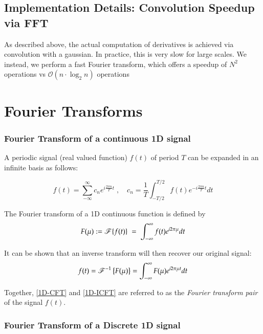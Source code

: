    
\subsection{Implementation Details: Convolution Speedup via FFT}

As described above, the actual computation of derivatives is achieved via convolution with a gaussian. In practice, this is very slow for large scales. We instead, we perform a fast Fourier transform, which offers a speedup of $N^2$ operations vs $\mathscr{O}\left(n\cdot \log_2n\right)$ operations 

\section{Fourier Transforms}
\subsubsection{Fourier Transform of a continuous 1D signal}


A periodic signal (real valued function) $f(t)$ of period $T$ can  be expanded in an infinite basis as follows:

\begin{equation}
	f(t) = \sum_{-\infty}^{\infty} c_n e^{i\frac{2\pi n}{T}t} \;,\quad
		c_n = \frac{1}{T}\int_{-T/2}^{T/2} f(t) e^{-i\frac{2\pi n}{T}t} dt
		\end{equation}

The Fourier transform of a 1D continuous function is defined by
\begin{equation} \label{1D-CFT}
	F(\mu) := \operatorname{\mathscr{F}}\{f(t)\} \;=\; \int_{-\infty}^{\infty} f(t) e^{i2\pi \mu } dt
\end{equation}

It can be shown  that an inverse transform will then recover our original signal:
\begin{equation} \label{1D-ICFT}
	f(t) = \operatorname{\mathscr{F}}^{-1}\left\{F(\mu)\right\} = \int_{-\infty}^{\infty} F(\mu) e^{i2\pi \mu t} dt
\end{equation}

Together, \cref{1D-CFT} and \cref{1D-ICFT} are referred to as the \textit{Fourier transform pair} of the signal $f(t)$. 

\subsubsection{Fourier Transform of a Discrete 1D signal}

